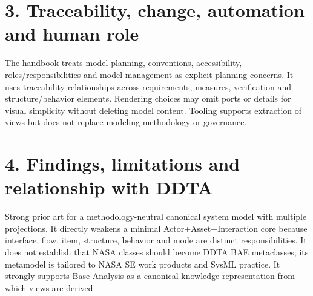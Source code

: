 \documentclass[10pt,a4paper]{article}
\begin{document}
\section{3. Traceability, change, automation and human role}
The handbook treats model planning, conventions, accessibility, roles/responsibilities and model management as explicit planning concerns. It uses traceability relationships across requirements, measures, verification and structure/behavior elements. Rendering choices may omit ports or details for visual simplicity without deleting model content. Tooling supports extraction of views but does not replace modeling methodology or governance.
\section{4. Findings, limitations and relationship with DDTA}
Strong prior art for a methodology-neutral canonical system model with multiple projections. It directly weakens a minimal Actor+Asset+Interaction core because interface, flow, item, structure, behavior and mode are distinct responsibilities. It does not establish that NASA classes should become DDTA BAE metaclasses; its metamodel is tailored to NASA SE work products and SysML practice. It strongly supports Base Analysis as a canonical knowledge representation from which views are derived.
\end{document}
